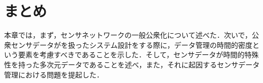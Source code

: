 \section{まとめ}
本章では，まず，センサネットワークの一般公衆化について述べた．次いで，公衆センサデータがを扱ったシステム設計をする際に，データ管理の時間的密度という要素を考慮すべきであることを示した．そして，センサデータが時間的特殊性を持った多次元データであることを述べ，また，それに起因するセンサデータ管理における問題を提起した．
